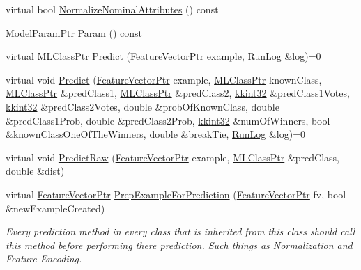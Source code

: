 \begin{DoxyCompactItemize}
\item 
virtual bool \hyperlink{class_k_k_m_l_l_1_1_model_a54d47b99bee6021d93811debaccc1037}{Normalize\+Nominal\+Attributes} () const 
\item 
\hyperlink{namespace_k_k_m_l_l_a76c2dec3304f1a2dc2e357872e4fb320}{Model\+Param\+Ptr} \hyperlink{class_k_k_m_l_l_1_1_model_aa0e48fb1263b2c6bbae44cf2e573a160}{Param} () const 
\item 
virtual \hyperlink{namespace_k_k_m_l_l_ac272393853d59e72e8456f14cd6d8c23}{M\+L\+Class\+Ptr} \hyperlink{class_k_k_m_l_l_1_1_model_a58ced625000ae9bffffb339e3c73d259}{Predict} (\hyperlink{namespace_k_k_m_l_l_a0c5df3d48f45926fbc4fee04f5e3bc04}{Feature\+Vector\+Ptr} example, \hyperlink{class_k_k_b_1_1_run_log}{Run\+Log} \&log)=0
\item 
virtual void \hyperlink{class_k_k_m_l_l_1_1_model_a631de950cab4c8cbcbc1bbdb252964d7}{Predict} (\hyperlink{namespace_k_k_m_l_l_a0c5df3d48f45926fbc4fee04f5e3bc04}{Feature\+Vector\+Ptr} example, \hyperlink{namespace_k_k_m_l_l_ac272393853d59e72e8456f14cd6d8c23}{M\+L\+Class\+Ptr} known\+Class, \hyperlink{namespace_k_k_m_l_l_ac272393853d59e72e8456f14cd6d8c23}{M\+L\+Class\+Ptr} \&pred\+Class1, \hyperlink{namespace_k_k_m_l_l_ac272393853d59e72e8456f14cd6d8c23}{M\+L\+Class\+Ptr} \&pred\+Class2, \hyperlink{namespace_k_k_b_a8fa4952cc84fda1de4bec1fbdd8d5b1b}{kkint32} \&pred\+Class1\+Votes, \hyperlink{namespace_k_k_b_a8fa4952cc84fda1de4bec1fbdd8d5b1b}{kkint32} \&pred\+Class2\+Votes, double \&prob\+Of\+Known\+Class, double \&pred\+Class1\+Prob, double \&pred\+Class2\+Prob, \hyperlink{namespace_k_k_b_a8fa4952cc84fda1de4bec1fbdd8d5b1b}{kkint32} \&num\+Of\+Winners, bool \&known\+Class\+One\+Of\+The\+Winners, double \&break\+Tie, \hyperlink{class_k_k_b_1_1_run_log}{Run\+Log} \&log)=0
\item 
virtual void \hyperlink{class_k_k_m_l_l_1_1_model_abf303d5a13e6db342cacf77b1e4ed209}{Predict\+Raw} (\hyperlink{namespace_k_k_m_l_l_a0c5df3d48f45926fbc4fee04f5e3bc04}{Feature\+Vector\+Ptr} example, \hyperlink{namespace_k_k_m_l_l_ac272393853d59e72e8456f14cd6d8c23}{M\+L\+Class\+Ptr} \&pred\+Class, double \&dist)
\item 
virtual \hyperlink{namespace_k_k_m_l_l_a0c5df3d48f45926fbc4fee04f5e3bc04}{Feature\+Vector\+Ptr} \hyperlink{class_k_k_m_l_l_1_1_model_a31b972adfb64769b3ae966debec824fd}{Prep\+Example\+For\+Prediction} (\hyperlink{namespace_k_k_m_l_l_a0c5df3d48f45926fbc4fee04f5e3bc04}{Feature\+Vector\+Ptr} fv, bool \&new\+Example\+Created)
\begin{DoxyCompactList}\small\item\em Every prediction method in every class that is inherited from this class should call this method before performing there prediction. Such things as Normalization and Feature Encoding. \end{DoxyCompactList}\item 

\end{DoxyCompactItemize}
